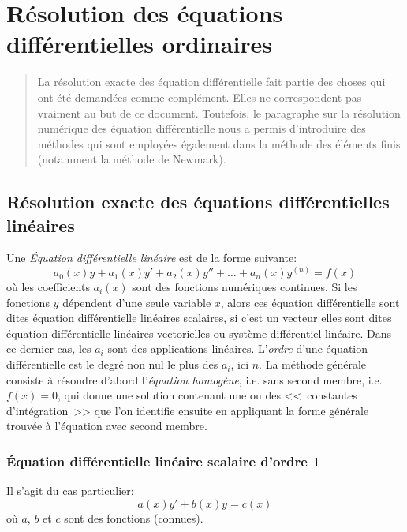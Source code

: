 \chapter{Résolution des équations différentielles ordinaires}\label{Ch-ED} 
\begin{abstract} La résolution exacte des équation différentielle fait partie des choses qui ont été demandées comme complément. Elles ne correspondent pas vraiment au but de ce document. Toutefois, le paragraphe sur la résolution numérique des équation différentielle nous a permis d'introduire des méthodes qui sont employées également dans la méthode des éléments finis (notamment la méthode de Newmark). 
\end{abstract} 
\section{Résolution exacte des équations différentielles linéaires} Une \emph{Équation différentielle linéaire} est de la forme suivante:
\begin{equation}
a_0(x) y + a_1(x) y' + a_2(x) y'' + \ldots + a_n(x) y^{(n)}= f(x)
\end{equation}
où les coefficients $a_i(x)$ sont des fonctions numériques continues. Si les fonctions $y$ dépendent d'une seule variable $x$, alors ces équation différentielle sont dites équation différentielle linéaires scalaires, si c'est un vecteur elles sont dites équation différentielle linéaires vectorielles ou système différentiel linéaire. Dans ce dernier cas, les $a_i$ sont des applications linéaires. L'\emph{ordre} d'une équation différentielle est le degré non nul le plus des $a_i$, ici $n$. 
 La méthode générale consiste à résoudre d'abord l'\emph{équation homogène}, i.e. sans second membre, i.e. $f(x)=0$, qui donne une solution contenant une ou des <<~constantes d'intégration~>> que l'on identifie ensuite en appliquant la forme générale trouvée à l'équation avec second membre. 
 
\subsection{Équation différentielle linéaire scalaire d'ordre 1} 
Il s'agit du cas particulier:
\begin{equation}
a(x)y' + b(x)y = c(x)
\end{equation}
où $a$, $b$ et $c$ sont des fonctions (connues). 
